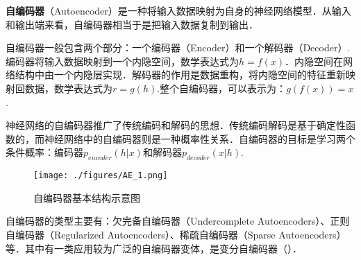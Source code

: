 
\textbf{自编码器}（Autoencoder）是一种将输入数据映射为自身的神经网络模型．从输入和输出端来看，自编码器相当于是把输入数据复制到输出．

自编码器一般包含两个部分：一个编码器（Encoder）和一个解码器（Decoder）.编码器将输入数据映射到一个内隐空间，数学表达式为$h=f(x)$．内隐空间在网络结构中由一个内隐层实现．解码器的作用是数据重构，将内隐空间的特征重新映射回数据，数学表达式为$r=g(h)$.整个自编码器，可以表示为：$g(f(x))=x$.

神经网络的自编码器推广了传统编码和解码的思想．传统编码解码是基于确定性函数的，而神经网络中的自编码器则是一种概率性关系．自编码器的目标是学习两个条件概率：编码器$p_{encoder}(h|x)$和解码器$p_{decoder}(x|h)$\cite{GDL}.

\begin{figure}[ht]
\centering
\texttt{[image: ./figures/AE\_1.png]}
\caption{自编码器基本结构示意图} \label{AE_fig1}
\end{figure}


自编码器的类型主要有：欠完备自编码器（Undercomplete Autoencoders）、正则自编码器（Regularized Autoencoders）、稀疏自编码器（Sparse Autoencoders）等．其中有一类应用较为广泛的自编码器变体，是变分自编码器（）．